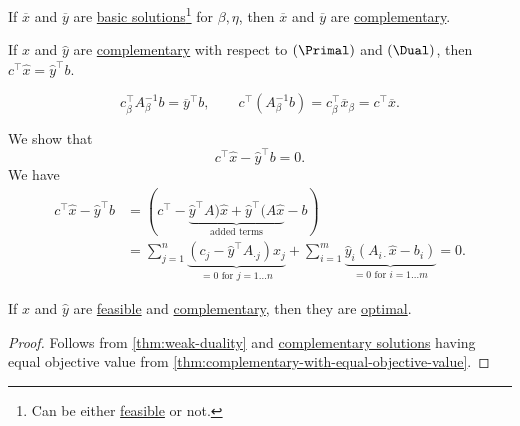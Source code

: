 \begin{theorem}\label{thm:lec10-1}
	If \(\overline{x}\) and \(\overline{y}\) are \hyperref[def:basic-solution]{basic solutions}\footnote{Can be either \hyperref[def:feasible-solution]{feasible} or not.} for \(\beta, \eta\), then \(\overline{x}\) and \(\overline{y}\) are \hyperref[def:complementary]{complementary}.
\end{theorem}

\begin{theorem}\label{thm:complementary-with-equal-objective-value}
	If \(\hat{x}\) and \(\hat{y}\) are \hyperref[def:complementary]{complementary} with respect to \((\Primal)\) and \((\Dual)\), then \(c^{\top}\hat{x} = \hat{y}^{\top} b\).
\end{theorem}
\begin{note}
	\[
		c^{\top}_{\beta} A^{-1}_{\beta}b = \overline{y}^{\top} b,\qquad c^{\top}(A^{-1}_{\beta} b) = c^{\top}_{\beta}\overline{x}_{\beta} = c^{\top}\overline{x}.
	\]
\end{note}
\begin{explanation}
	We show that
	\[
		c^{\top} \hat{x} - \hat{y}^{\top} b = 0.
	\]
	We have
	\[
		\begin{split}
			c^{\top} \hat{x} - \hat{y}^{\top} b & = (c^{\top} - \underbrace{\hat{y}^{\top}A)\hat{x} + \hat{y}^{\top}(A \hat{x}}_{\text{added terms}} - b)    \\
			                                    & =\sum\limits_{j=1}^{n} \underbrace{(c_{j}-\hat{y}^{\top}A_{\cdot j})x_{j}}_{ = 0\text{ for } j = 1\dots n}
			+ \sum\limits_{i=1}^{m} \underbrace{\hat{y}_i(A_{i\cdot}\hat{x} - b_{i})}_{ = 0\text{ for } i = 1\dots m}
			= 0.
		\end{split}
	\]
\end{explanation}

\begin{theorem}\label{thm:weak-complementary-slackness-theorem}
	If \(\hat{x}\) and \(\hat{y}\) are \hyperref[def:feasible-solution]{feasible} and \hyperref[def:complementary]{complementary}, then they are \hyperref[def:optimal-solution]{optimal}.
\end{theorem}
\begin{proof}
	Follows from \autoref{thm:weak-duality} and \hyperref[def:complementary]{complementary solutions} having equal objective value from \autoref{thm:complementary-with-equal-objective-value}.
\end{proof}

